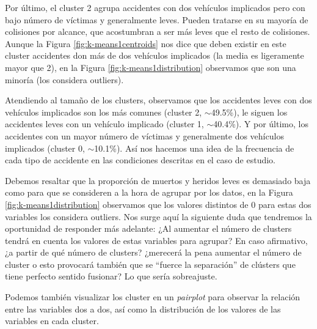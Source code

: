 \documentclass[oneside]{book}
\begin{document}
Por último, el cluster 2 agrupa accidentes con dos vehículos
implicados pero con bajo número de víctimas y generalmente
leves. Pueden tratarse en su mayoría de colisiones por alcance, que
acostumbran a ser más leves que el resto de colisiones. Aunque la
Figura \ref{fig:k-means1centroids} nos dice que deben existir en este
cluster accidentes don más de dos vehículos implicados (la media es
ligeramente mayor que 2), en la Figura \ref{fig:k-means1distribution}
observamos que son una minoría (los considera outliers).

Atendiendo al tamaño de los clusters, observamos que los accidentes
leves con dos vehículos implicados son los más comunes (cluster 2,
$\sim$49.5\%), le siguen los accidentes leves con un vehículo
implicado (cluster 1, $\sim$40.4\%). Y por último, los accidentes con
un mayor número de víctimas y generalmente dos vehículos implicados
(cluster 0, $\sim$10.1\%). Así nos hacemos una idea de la frecuencia
de cada tipo de accidente en las condiciones descritas en el caso de
estudio.

Debemos resaltar que la proporción de muertos y heridos leves es
demasiado baja como para que se consideren a la hora de agrupar por
los datos, en la Figura \ref{fig:k-means1distribution} observamos que
los valores distintos de 0 para estas dos variables los considera
outliers. Nos surge aquí la siguiente duda que tendremos la
oportunidad de responder más adelante: ¿Al aumentar el número de
clusters tendrá en cuenta los valores de estas variables para agrupar?
En caso afirmativo, ¿a partir de qué número de clusters? ¿merecerá la
pena aumentar el número de cluster o esto provocará también que se
``fuerce la separación'' de clústers que tiene perfecto sentido
fusionar? Lo que sería sobreajuste.

Podemos también visualizar los cluster en un \textit{pairplot} para
observar la relación entre las variables dos a dos, así como la
distribución de los valores de las variables en cada cluster.
\end{document}
